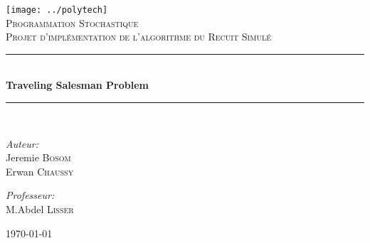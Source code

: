 \newcommand{\HRule}{\rule{\linewidth}{0.5mm}}

\begin{titlepage}
\begin{center}

\texttt{[image: ../polytech]}~\\[1cm]

\textsc{\LARGE Programmation Stochastique}\\[1.5cm]

\textsc{\Large Projet d'implémentation de l'algorithme du Recuit Simulé}\\[0.5cm]

\HRule \\[0.4cm]
{ \huge \bfseries Traveling Salesman Problem \\[0.4cm] }
\HRule \\[1.5cm]

\begin{minipage}{0.4\textwidth}
\begin{flushleft} \large
\emph{Auteur:}\\
Jeremie \textsc{Bosom}\\
Erwan \textsc{Chaussy}
\end{flushleft}
\end{minipage}
\begin{minipage}{0.4\textwidth}
\begin{flushright} \large
\emph{Professeur:} \\
M.Abdel \textsc{Lisser}
\end{flushright}
\end{minipage}

\vfill

{\large \today}

\end{center}
\end{titlepage}
